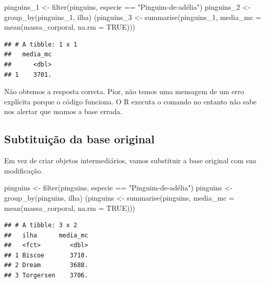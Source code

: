\documentclass[
]{book}
\newenvironment{Shaded}{\begin{snugshade}}{\end{snugshade}}
\newcommand{\AttributeTok}[1]{\textcolor[rgb]{0.77,0.63,0.00}{#1}}
\newcommand{\ConstantTok}[1]{\textcolor[rgb]{0.00,0.00,0.00}{#1}}
\newcommand{\FunctionTok}[1]{\textcolor[rgb]{0.00,0.00,0.00}{#1}}
\newcommand{\NormalTok}[1]{#1}
\newcommand{\OtherTok}[1]{\textcolor[rgb]{0.56,0.35,0.01}{#1}}
\newcommand{\SpecialCharTok}[1]{\textcolor[rgb]{0.00,0.00,0.00}{#1}}
\newcommand{\StringTok}[1]{\textcolor[rgb]{0.31,0.60,0.02}{#1}}
\begin{document}
\begin{Shaded}
\begin{Highlighting}[]
\NormalTok{pinguins\_1 }\OtherTok{\textless{}{-}} \FunctionTok{filter}\NormalTok{(pinguins, especie }\SpecialCharTok{==} \StringTok{"Pinguim{-}de{-}adélia"}\NormalTok{)}
\NormalTok{pinguins\_2 }\OtherTok{\textless{}{-}} \FunctionTok{group\_by}\NormalTok{(pinguins\_1, ilha)}
\NormalTok{(pinguins\_3 }\OtherTok{\textless{}{-}} \FunctionTok{summarise}\NormalTok{(pinguins\_1, }\AttributeTok{media\_mc =} \FunctionTok{mean}\NormalTok{(massa\_corporal, }\AttributeTok{na.rm =} \ConstantTok{TRUE}\NormalTok{)))}
\end{Highlighting}
\end{Shaded}

\begin{verbatim}
## # A tibble: 1 x 1
##   media_mc
##      <dbl>
## 1    3701.
\end{verbatim}

Não obtemos a resposta correta. Pior, não temos uma mensagem de um erro
explícita porque o código funciona. O R executa o comando no entanto não sabe
nos alertar que usamos a base errada.

\hypertarget{subtituiuxe7uxe3o-da-base-original}{%
\subsection{Subtituição da base original}\label{subtituiuxe7uxe3o-da-base-original}}

Em vez de criar objetos intermediários, vamos substituir a base original com sua modificação.

\begin{Shaded}
\begin{Highlighting}[]
\NormalTok{pinguins }\OtherTok{\textless{}{-}} \FunctionTok{filter}\NormalTok{(pinguins, especie }\SpecialCharTok{==} \StringTok{"Pinguim{-}de{-}adélia"}\NormalTok{)}
\NormalTok{pinguins }\OtherTok{\textless{}{-}} \FunctionTok{group\_by}\NormalTok{(pinguins, ilha)}
\NormalTok{(pinguins }\OtherTok{\textless{}{-}} \FunctionTok{summarise}\NormalTok{(pinguins, }\AttributeTok{media\_mc =} \FunctionTok{mean}\NormalTok{(massa\_corporal, }\AttributeTok{na.rm =} \ConstantTok{TRUE}\NormalTok{)))}
\end{Highlighting}
\end{Shaded}

\begin{verbatim}
## # A tibble: 3 x 2
##   ilha      media_mc
##   <fct>        <dbl>
## 1 Biscoe       3710.
## 2 Dream        3688.
## 3 Torgersen    3706.
\end{verbatim}
\end{document}
